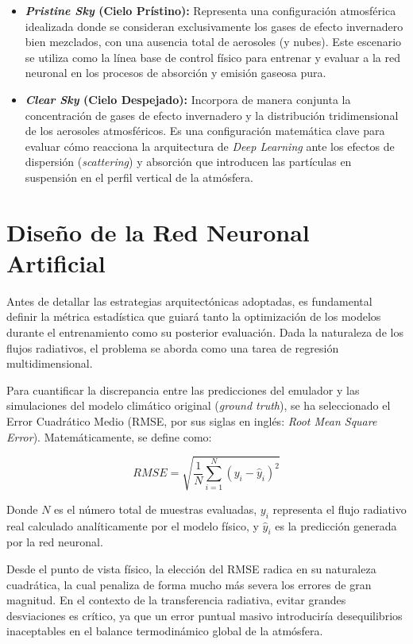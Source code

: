 \documentclass[11pt,a4paper,twoside,pdf]{article}
\numberwithin{equation}{section}
\begin{document}
\begin{itemize}
    \item \textbf{\textit{Pristine Sky} (Cielo Prístino):} Representa una configuración atmosférica idealizada donde se consideran exclusivamente los gases de efecto invernadero bien mezclados, con una ausencia total de aerosoles (y nubes). Este escenario se utiliza como la línea base de control físico para entrenar y evaluar a la red neuronal en los procesos de absorción y emisión gaseosa pura.

\newpage

    \item \textbf{\textit{Clear Sky} (Cielo Despejado):} Incorpora de manera conjunta la concentración de gases de efecto invernadero y la distribución tridimensional de los aerosoles atmosféricos. Es una configuración matemática clave para evaluar cómo reacciona la arquitectura de \textit{Deep Learning} ante los efectos de dispersión (\textit{scattering}) y absorción que introducen las partículas en suspensión en el perfil vertical de la atmósfera.
\end{itemize}

\section{Diseño de la Red Neuronal Artificial}

Antes de detallar las estrategias arquitectónicas adoptadas, es fundamental definir la métrica estadística que guiará tanto la optimización de los modelos durante el entrenamiento como su posterior evaluación. Dada la naturaleza de los flujos radiativos, el problema se aborda como una tarea de regresión multidimensional.

Para cuantificar la discrepancia entre las predicciones del emulador y las simulaciones del modelo climático original (\textit{ground truth}), se ha seleccionado el Error Cuadrático Medio (RMSE, por sus siglas en inglés: \textit{Root Mean Square Error}). Matemáticamente, se define como:

\begin{equation}
RMSE = \sqrt{\frac{1}{N} \sum_{i=1}^{N} (y_i - \hat{y}_i)^2}
\label{eq:rmse}
\end{equation}

Donde $N$ es el número total de muestras evaluadas, $y_i$ representa el flujo radiativo real calculado analíticamente por el modelo físico, y $\hat{y}_i$ es la predicción generada por la red neuronal. 

Desde el punto de vista físico, la elección del RMSE radica en su naturaleza cuadrática, la cual penaliza de forma mucho más severa los errores de gran magnitud. En el contexto de la transferencia radiativa, evitar grandes desviaciones es crítico, ya que un error puntual masivo introduciría desequilibrios inaceptables en el balance termodinámico global de la atmósfera.
\end{document}
